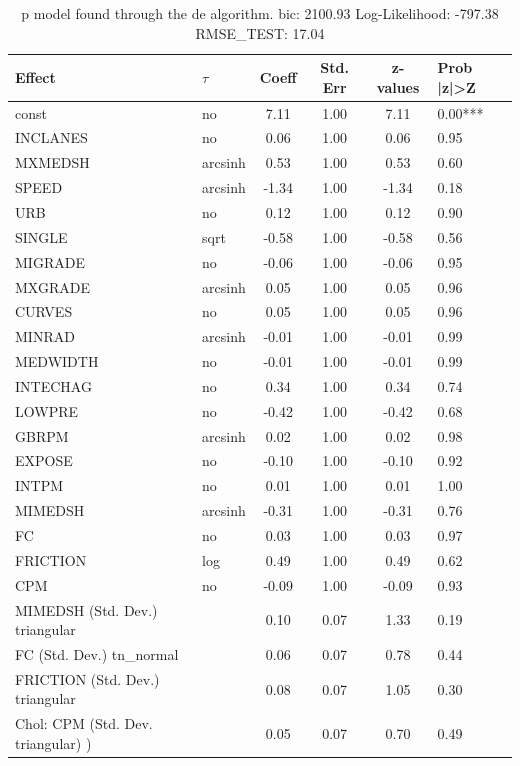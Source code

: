 \begin{table}
	\caption{p model found through the de algorithm. bic: 2100.93 Log-Likelihood: -797.38 RMSE_TEST: 17.04}
	\begin{center}
		\begin{tabular}{|l|l|c|c|c|l|}
			\hline
			Effect & $\tau$ & Coeff & Std. Err & z-values & Prob |z|>Z \\
			\hline
			const & no & 7.11 & 1.00 & 7.11 & 0.00*** \\
			\hline
			INCLANES & no & 0.06 & 1.00 & 0.06 & 0.95 \\
			\hline
			MXMEDSH & arcsinh & 0.53 & 1.00 & 0.53 & 0.60 \\
			\hline
			SPEED & arcsinh & -1.34 & 1.00 & -1.34 & 0.18 \\
			\hline
			URB & no & 0.12 & 1.00 & 0.12 & 0.90 \\
			\hline
			SINGLE & sqrt & -0.58 & 1.00 & -0.58 & 0.56 \\
			\hline
			MIGRADE & no & -0.06 & 1.00 & -0.06 & 0.95 \\
			\hline
			MXGRADE & arcsinh & 0.05 & 1.00 & 0.05 & 0.96 \\
			\hline
			CURVES & no & 0.05 & 1.00 & 0.05 & 0.96 \\
			\hline
			MINRAD & arcsinh & -0.01 & 1.00 & -0.01 & 0.99 \\
			\hline
			MEDWIDTH & no & -0.01 & 1.00 & -0.01 & 0.99 \\
			\hline
			INTECHAG & no & 0.34 & 1.00 & 0.34 & 0.74 \\
			\hline
			LOWPRE & no & -0.42 & 1.00 & -0.42 & 0.68 \\
			\hline
			GBRPM & arcsinh & 0.02 & 1.00 & 0.02 & 0.98 \\
			\hline
			EXPOSE & no & -0.10 & 1.00 & -0.10 & 0.92 \\
			\hline
			INTPM & no & 0.01 & 1.00 & 0.01 & 1.00 \\
			\hline
			MIMEDSH & arcsinh & -0.31 & 1.00 & -0.31 & 0.76 \\
			\hline
			FC & no & 0.03 & 1.00 & 0.03 & 0.97 \\
			\hline
			FRICTION & log & 0.49 & 1.00 & 0.49 & 0.62 \\
			\hline
			CPM & no & -0.09 & 1.00 & -0.09 & 0.93 \\
			\hline
			MIMEDSH (Std. Dev.) triangular &  & 0.10 & 0.07 & 1.33 & 0.19 \\
			\hline
			FC (Std. Dev.) tn_normal &  & 0.06 & 0.07 & 0.78 & 0.44 \\
			\hline
			FRICTION (Std. Dev.) triangular &  & 0.08 & 0.07 & 1.05 & 0.30 \\
			\hline
			 Chol: CPM (Std. Dev. triangular) ) &  & 0.05 & 0.07 & 0.70 & 0.49 \\
			\hline
		\end{tabular}
	\end{center}
\end{table}